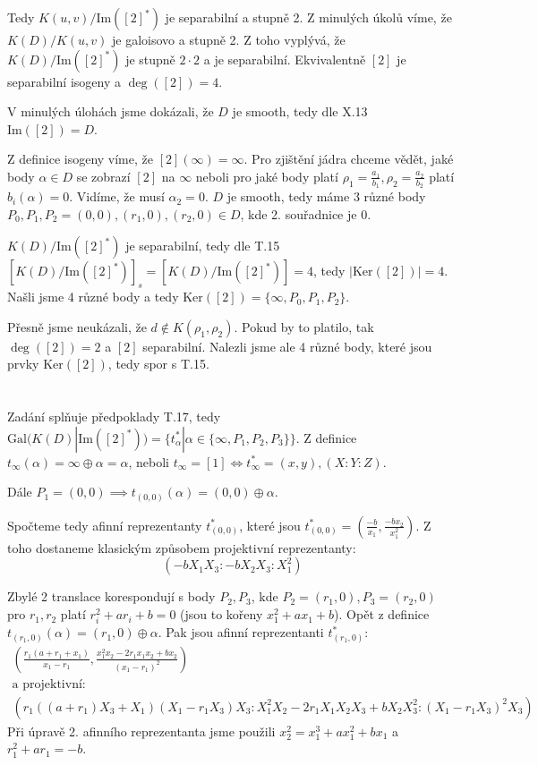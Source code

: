 \documentclass[12pt, a4paper]{article}
\begin{document}
Tedy $K(u,v)/\text{Im}([2]^*)$ je separabilní a stupně 2. Z minulých úkolů víme, že $K(D)/K(u,v)$ je galoisovo a stupně 2. Z toho vyplývá, že $K(D)/\text{Im}([2]^*)$ je stupně $2\cdot2$ a je separabilní. Ekvivalentně $[2]$ je separabilní isogeny a $\deg([2])=4$.

V minulých úlohách jsme dokázali, že $D$ je smooth, tedy dle X.13 $\text{Im}([2])=D$.

Z definice isogeny víme, že $[2](\infty) = \infty$. Pro zjištění jádra chceme vědět, jaké body $\alpha \in D$ se zobrazí $[2]$ na $\infty$ neboli pro jaké body platí $\rho_1 = \frac{a_1}{b_1}, \rho_2 = \frac{a_2}{b_2}$ platí $b_i(\alpha)=0$. Vidíme, že musí $\alpha_2 = 0$. $D$ je smooth, tedy máme $3$ různé body $P_0,P_1,P_2 = (0,0),(r_1,0),(r_2,0) \in D$, kde 2. souřadnice je 0.

$K(D)/\text{Im}([2]^*)$ je separabilní, tedy dle T.15 $[K(D)/\text{Im}([2]^*)]_s = [K(D)/\text{Im}([2]^*)] = 4$, tedy $|\text{Ker}([2])|=4$. Našli jsme 4 různé body a tedy $\text{Ker}([2]) = \{\infty, P_0, P_1, P_2\}$. 

Přesně jsme neukázali, že $d \notin K(\rho_1, \rho_2)$. Pokud by to platilo, tak $\deg([2]) = 2$ a $[2]$ separabilní. Nalezli jsme ale 4 různé body, které jsou prvky $\text{Ker}([2])$, tedy spor s T.15.

\section{}
Zadání splňuje předpoklady T.17, tedy $\text{Gal}(K(D)|\text{Im}([2]^*)) = \{t^*_\alpha| \alpha \in \{\infty, P_1, P_2, P_3\}\}$.
Z definice $t_\infty (\alpha) = \infty \oplus \alpha = \alpha$, neboli $t_\infty = [1] \iff t_\infty^* = (x,y), (X:Y:Z)$.

Dále $P_1 = (0,0) \implies t_{(0,0)}(\alpha) = (0,0) \oplus \alpha$.

Spočteme tedy afinní reprezentanty $t_{(0,0)}^*$, které jsou $t_{(0,0)}^* = \left( \frac{-b}{x_1}, \frac{-bx_2}{x_1^2} \right)$. Z toho dostaneme klasickým způsobem projektivní reprezentanty: 
\[(-bX_1X_3 : -bX_2X_3 : X_1^2) \]

Zbylé 2 translace korespondují s body $P_2,P_3$, kde $P_2 = (r_1, 0), P_3 = (r_2, 0)$ pro $r_1,r_2$ platí $r_i^2+ar_i+b = 0$ (jsou to kořeny $x_1^2+ax_1+b$). Opět z definice $t_{(r_1,0)}(\alpha) = (r_1,0) \oplus \alpha$. Pak jsou afinní reprezentanti $t_{(r_1,0)}^*$: 
\begin{gather*}
\left(\frac{r_1(a+r_1+x_1)}{x_1-r_1}, \frac{x_1^2x_2-2r_1x_1x_2 + bx_2}{(x_1-r_1)^2} \right )\\
\text{a projektivní:}\\
\left(r_1((a+r_1)X_3 + X_1)(X_1-r_1X_3)X_3 : X_1^2X_2-2r_1X_1X_2X_3+bX_2X_3^2 : (X_1-r_1X_3)^2X_3 \right)
\end{gather*}
Při úpravě 2. afinního reprezentanta jsme použili $x_2^2 = x_1^3+ax_1^2+bx_1$ a $r_1^2+ar_1 = -b$.
\end{document}
